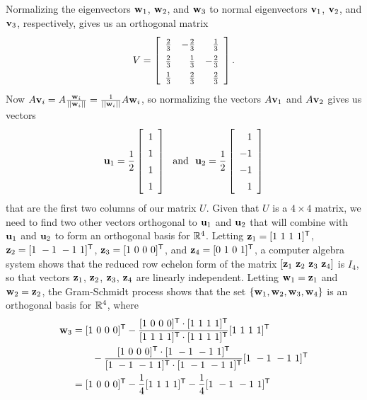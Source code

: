 \begin{example}
\ba
\item Normalizing the eigenvectors $\mathbf{w}_1$, $\mathbf{w}_2$, and $\mathbf{w}_3$ to normal eigenvectors $\mathbf{v}_1$, $\mathbf{v}_2$, and $\mathbf{v}_3$, respectively, gives us an orthogonal matrix
\[V = \left[ \renewcommand{\arraystretch}{1.4} \begin {array}{crr} \frac{2}{3}&-\frac{2}{3}&\frac{1}{3}\\ \frac{2}{3}&\frac{1}{3}&-
\frac{2}{3}\\  \frac{1}{3}&\frac{2}{3}&\frac{2}{3}\end {array} \right].\]
Now $A \mathbf{v}_i = A \frac{\mathbf{w}_i}{||\mathbf{w}_i||} = \frac{1}{|| \mathbf{w}_i ||} A \mathbf{w}_i$, so normalizing the vectors $A \mathbf{v}_1$ and $A \mathbf{v}_2$ gives us vectors \[\vu_1 = \frac{1}{2} \left[ \begin{array}{c} 1\\1\\1\\1\\ \end{array} \right] \ \text{ and } \ \vu_2 = \frac{1}{2} \left[ \begin{array}{r} 1\\-1\\-1\\1\\ \end{array} \right]\]
that are the first two columns of our matrix $U$. Given that $U$ is a $4 \times 4$ matrix, we need to find two other vectors orthogonal to $\mathbf{u}_1$ and $\mathbf{u}_2$ that will combine with $\mathbf{u}_1$ and $\mathbf{u}_2$ to form an orthogonal basis for $\mathbb{R}^4$. Letting $\mathbf{z}_1 = [1 \ 1 \ 1 \ 1]^{\mathsf{T}}$, $\mathbf{z}_2 = [1 \ -1 \ -1 \ 1]^{\mathsf{T}}$, $\mathbf{z}_3 = [1 \ 0 \ 0 \ 0]^{\mathsf{T}}$, and $\mathbf{z}_4 = [0 \ 1 \ 0 \ 1]^{\mathsf{T}}$, a computer algebra system shows that the reduced row echelon form of the matrix $[\mathbf{z}_1 \ \mathbf{z}_2 \ \mathbf{z}_3 \ \mathbf{z}_4]$ is $I_4$, so that vectors $\mathbf{z}_1$, $\mathbf{z}_2$, $\mathbf{z}_3$, $\mathbf{z}_4$ are linearly independent. Letting $\mathbf{w}_1 = \mathbf{z}_1$ and $\mathbf{w}_2 = \mathbf{z}_2$, the Gram-Schmidt process shows that the set $\{\mathbf{w}_1, \mathbf{w}_2, \mathbf{w}_3, \mathbf{w}_4\}$ is an orthogonal basis for $\mathbb{R}^4$, where 
\begin{align*}
\vw_3 &= [1 \ 0 \ 0 \ 0]^{\tr} - \frac{[1 \ 0 \ 0 \ 0]^{\tr} \cdot [1 \ 1 \ 1 \ 1]^{\tr}}{[1 \ 1 \ 1 \ 1]^{\tr} \cdot [1 \ 1 \ 1 \ 1]^{\tr}} [1 \ 1 \ 1 \ 1]^{\tr} \\
	&\qquad - \frac{[1 \ 0 \ 0 \ 0]^{\tr} \cdot [1 \ -1 \ -1 \ 1]^{\tr}}{[1 \ -1 \ -1 \ 1]^{\tr} \cdot [1 \ -1 \ -1 \ 1]^{\tr}} [1 \ -1 \ -1 \ 1]^{\tr} \\
	&= [1 \ 0 \ 0 \ 0]^{\tr} - \frac{1}{4}[1 \ 1 \ 1 \ 1]^{\tr} - \frac{1}{4} [1 \ -1 \ -1 \ 1]^{\tr} \\

\end{align*}
\end{example}
